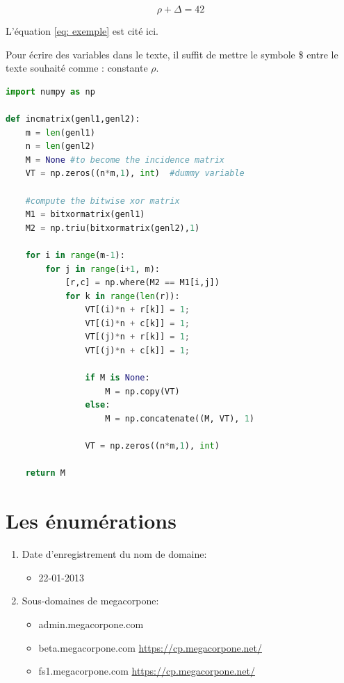 \documentclass{rapportHenallux}
\begin{document}

\begin{equation} \label{eq: exemple}
\rho + \Delta = 42
\end{equation}

L'équation \ref{eq: exemple} est cité ici. 


Pour écrire des variables dans le texte, il suffit\cite{einstein} de mettre le symbole \$ entre le texte souhaité comme : constante $\rho$. 
\begin{lstlisting}[language=Python, title=test.py]
import numpy as np
    
def incmatrix(genl1,genl2):
    m = len(genl1)
    n = len(genl2)
    M = None #to become the incidence matrix
    VT = np.zeros((n*m,1), int)  #dummy variable
    
    #compute the bitwise xor matrix
    M1 = bitxormatrix(genl1)
    M2 = np.triu(bitxormatrix(genl2),1) 

    for i in range(m-1):
        for j in range(i+1, m):
            [r,c] = np.where(M2 == M1[i,j])
            for k in range(len(r)):
                VT[(i)*n + r[k]] = 1;
                VT[(i)*n + c[k]] = 1;
                VT[(j)*n + r[k]] = 1;
                VT[(j)*n + c[k]] = 1;
                
                if M is None:
                    M = np.copy(VT)
                else:
                    M = np.concatenate((M, VT), 1)
                
                VT = np.zeros((n*m,1), int)
    
    return M
\end{lstlisting}

\section{Les énumérations}
\begin{enumerate}
    \item Date d'enregistrement du nom de domaine:
    \begin{itemize}
        \item 22-01-2013
    \end{itemize}
    \item Sous-domaines de megacorpone:
    \begin{itemize}
        \item admin.megacorpone.com
        \item beta.megacorpone.com \url{https://cp.megacorpone.net/}
        \item fs1.megacorpone.com \url{https://cp.megacorpone.net/}
    \end{itemize}
\end{enumerate}
\end{document}
